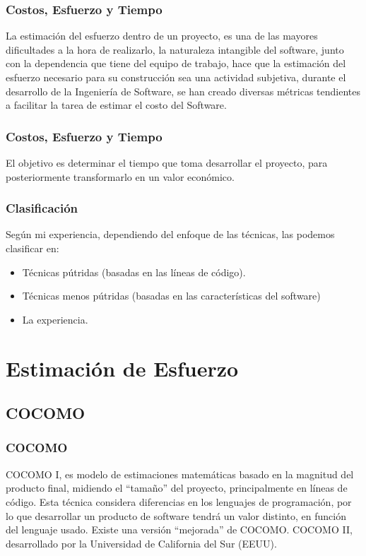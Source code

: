 \documentclass[12pt]{beamer}
\begin{document}
\begin{frame}
 \frametitle{Costos, Esfuerzo y Tiempo}
 La estimación del esfuerzo dentro de un proyecto, es una de las mayores dificultades a la hora de realizarlo, la naturaleza intangible del software, junto con la dependencia que tiene del equipo de trabajo, hace que la estimación del esfuerzo necesario para su construcción sea una actividad \alert{subjetiva}, durante el desarrollo de la Ingeniería de Software, se han creado diversas métricas tendientes a facilitar la tarea de estimar el costo del Software.
\end{frame}


\begin{frame}
 \frametitle{Costos, Esfuerzo y Tiempo}
 El objetivo es determinar el tiempo que toma desarrollar el proyecto, para posteriormente transformarlo en un valor económico.
\end{frame}


\begin{frame}
 \frametitle{Clasificación}
 Según mi experiencia, dependiendo del enfoque de las técnicas, las podemos clasificar en:
 \begin{itemize}
  \item<2-> Técnicas pútridas (basadas en las líneas de código). 
  \item<3-> Técnicas menos pútridas (basadas en las características del software)
  \item<4-> La experiencia.
 \end{itemize}
\end{frame}

\section{Estimación de Esfuerzo}
\subsection{COCOMO}

\begin{frame}
  \frametitle{COCOMO}
  COCOMO I, es modelo de estimaciones matemáticas basado en la magnitud del producto final, midiendo el ``tamaño'' del proyecto, principalmente en líneas de
código. Esta técnica considera diferencias en los lenguajes de programación, por lo que desarrollar un producto de software tendrá un valor distinto, en función del lenguaje usado.
\newline
Existe una versión ``mejorada'' de COCOMO. COCOMO II, desarrollado por la  Universidad de California del Sur (EEUU). 
\end{frame}
\end{document}
